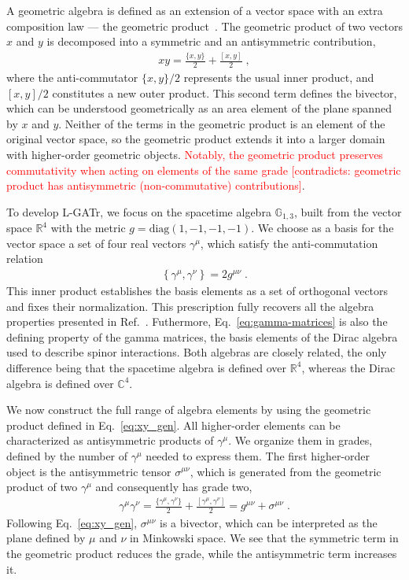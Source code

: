 \documentclass[submission, Phys]{SciPost}
\begin{document}
A geometric algebra is defined as an extension of a vector space with an extra composition law --- the geometric product~\cite{hestenes1966space}. The geometric product of two vectors $x$ and $y$ is decomposed into a symmetric and an antisymmetric contribution,
%
\begin{align}
    xy = \frac{\{x,y \}}{2} + \frac{[x,y]}{2}  \; ,
    \label{eq:xy_gen}
\end{align}
%
where the anti-commutator $\{x,y \}/2$ represents the usual inner product, and $[x,y]/2$ constitutes a new outer product. This second term defines the bivector, which can be understood geometrically as an area element of the plane spanned by $x$ and $y$. Neither of the terms in the geometric product is an element of the original vector space, so the geometric product extends it into a larger domain with higher-order geometric objects. \textcolor{red}{Notably, the geometric product preserves commutativity when acting on elements of the same grade [contradicts: geometric product has antisymmetric (non-commutative) contributions]}.

To develop L-GATr, we focus on the spacetime algebra $\mathbb{G}_{1,3}$, built from the vector space $\mathbb{R}^{4}$ with the metric $g=\text{diag}(1,-1,-1,-1)$. We choose as a basis for the vector space a set of four real vectors $\gamma^\mu$, which satisfy the anti-commutation relation
%
\begin{align}
    \left\{\gamma^{\mu}, \gamma^{\nu} \right\} = 2 g^{\mu\nu} \; .
    \label{eq:gamma-matrices}
\end{align}
%
This inner product establishes the basis elements as a set of orthogonal vectors and fixes their normalization. This prescription fully recovers all the algebra properties presented in Ref.~\cite{Spinner:2024hjm}. Futhermore, Eq.~\eqref{eq:gamma-matrices} is also the defining property of the gamma matrices, the basis elements of the Dirac algebra used to describe spinor interactions. Both algebras are closely related, the only difference being that the spacetime algebra is defined over $\mathbb{R}^4$, whereas the Dirac algebra is defined over $\mathbb{C}^4$.

We now construct the full range of algebra elements by using the geometric product defined in Eq.~\eqref{eq:xy_gen}. All higher-order elements can be characterized as antisymmetric products of $\gamma^{\mu}$. We organize them in grades, defined by the number of $\gamma^\mu$ needed to express them. The first higher-order object is  the antisymmetric tensor $\sigma^{\mu\nu}$, which is generated from the geometric product of two $\gamma^\mu$ and consequently has grade two,
%
\begin{align}
    \gamma^{\mu} \gamma^{\nu} 
    = \frac{\{ \gamma^\mu, \gamma^\nu \}}{2} + \frac{[ \gamma^\mu, \gamma^\nu]}{2} 
    = g^{\mu\nu} + \sigma^{\mu \nu}  \; .
\end{align}
%
Following Eq.~\eqref{eq:xy_gen}, $\sigma^{\mu\nu}$ is a bivector, which can be interpreted as the plane defined by $\mu$ and $\nu$ in Minkowski space. We see that the symmetric term in the geometric product reduces the grade, while the antisymmetric term increases it.
\end{document}
